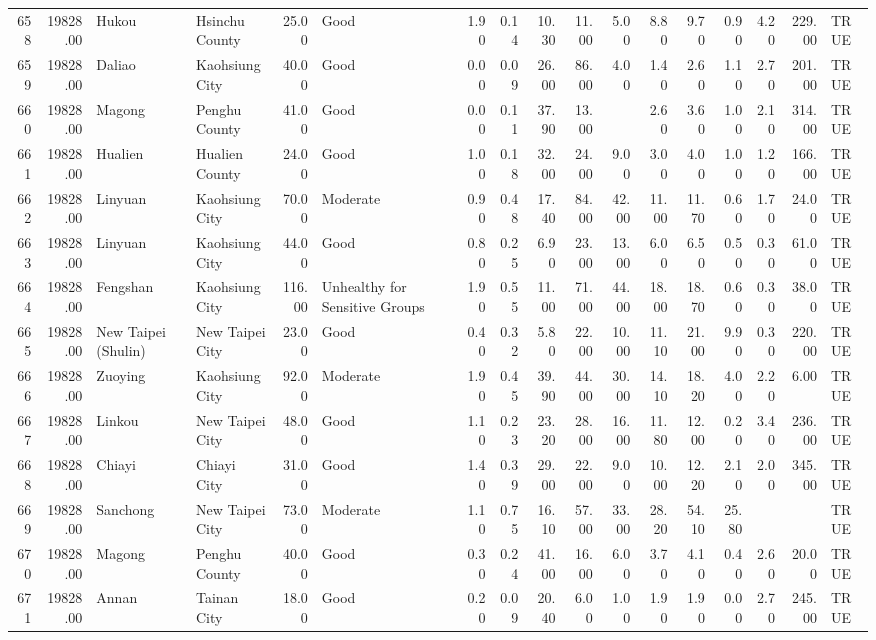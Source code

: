 \begin{table}[ht]
\begin{tabular}{rrllrlrrrrrrrrrrl}
  658 & 19828.00 & Hukou & Hsinchu County & 25.00 & Good & 1.90 & 0.14 & 10.30 & 11.00 & 5.00 & 8.80 & 9.70 & 0.90 & 4.20 & 229.00 & TRUE \\ 
  659 & 19828.00 & Daliao & Kaohsiung City & 40.00 & Good & 0.00 & 0.09 & 26.00 & 86.00 & 4.00 & 1.40 & 2.60 & 1.10 & 2.70 & 201.00 & TRUE \\ 
  660 & 19828.00 & Magong & Penghu County & 41.00 & Good & 0.00 & 0.11 & 37.90 & 13.00 &  & 2.60 & 3.60 & 1.00 & 2.10 & 314.00 & TRUE \\ 
  661 & 19828.00 & Hualien & Hualien County & 24.00 & Good & 1.00 & 0.18 & 32.00 & 24.00 & 9.00 & 3.00 & 4.00 & 1.00 & 1.20 & 166.00 & TRUE \\ 
  662 & 19828.00 & Linyuan & Kaohsiung City & 70.00 & Moderate & 0.90 & 0.48 & 17.40 & 84.00 & 42.00 & 11.00 & 11.70 & 0.60 & 1.70 & 24.00 & TRUE \\ 
  663 & 19828.00 & Linyuan & Kaohsiung City & 44.00 & Good & 0.80 & 0.25 & 6.90 & 23.00 & 13.00 & 6.00 & 6.50 & 0.50 & 0.30 & 61.00 & TRUE \\ 
  664 & 19828.00 & Fengshan & Kaohsiung City & 116.00 & Unhealthy for Sensitive Groups & 1.90 & 0.55 & 11.00 & 71.00 & 44.00 & 18.00 & 18.70 & 0.60 & 0.30 & 38.00 & TRUE \\ 
  665 & 19828.00 & New Taipei (Shulin) & New Taipei City & 23.00 & Good & 0.40 & 0.32 & 5.80 & 22.00 & 10.00 & 11.10 & 21.00 & 9.90 & 0.30 & 220.00 & TRUE \\ 
  666 & 19828.00 & Zuoying & Kaohsiung City & 92.00 & Moderate & 1.90 & 0.45 & 39.90 & 44.00 & 30.00 & 14.10 & 18.20 & 4.00 & 2.20 & 6.00 & TRUE \\ 
  667 & 19828.00 & Linkou & New Taipei City & 48.00 & Good & 1.10 & 0.23 & 23.20 & 28.00 & 16.00 & 11.80 & 12.00 & 0.20 & 3.40 & 236.00 & TRUE \\ 
  668 & 19828.00 & Chiayi & Chiayi City & 31.00 & Good & 1.40 & 0.39 & 29.00 & 22.00 & 9.00 & 10.00 & 12.20 & 2.10 & 2.00 & 345.00 & TRUE \\ 
  669 & 19828.00 & Sanchong & New Taipei City & 73.00 & Moderate & 1.10 & 0.75 & 16.10 & 57.00 & 33.00 & 28.20 & 54.10 & 25.80 &  &  & TRUE \\ 
  670 & 19828.00 & Magong & Penghu County & 40.00 & Good & 0.30 & 0.24 & 41.00 & 16.00 & 6.00 & 3.70 & 4.10 & 0.40 & 2.60 & 20.00 & TRUE \\ 
  671 & 19828.00 & Annan & Tainan City & 18.00 & Good & 0.20 & 0.09 & 20.40 & 6.00 & 1.00 & 1.90 & 1.90 & 0.00 & 2.70 & 245.00 & TRUE \\ 

\end{tabular}
\end{table}
